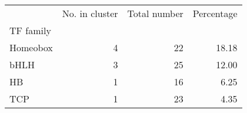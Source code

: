 \begin{tabular}{lrrr}
\toprule
{} &  No. in cluster &  Total number &  Percentage \\
TF family &                 &               &             \\
\midrule
Homeobox  &               4 &            22 &       18.18 \\
bHLH      &               3 &            25 &       12.00 \\
HB        &               1 &            16 &        6.25 \\
TCP       &               1 &            23 &        4.35 \\
\bottomrule
\end{tabular}
